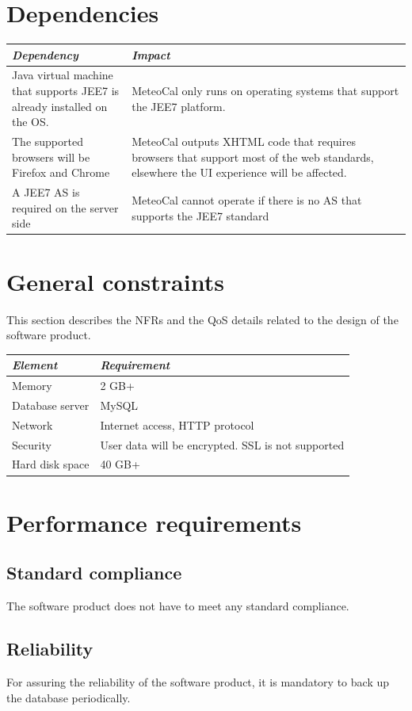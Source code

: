 \documentclass[10pt,a4paper,titlepage]{article}
\begin{document}
\section{Dependencies}
\begin{tabular}{| p{0.3\linewidth} | p{0.7\linewidth} |}
\hline	\emph{Dependency}	&	\emph{Impact}	\\
\hline	Java virtual machine that supports JEE7 is already installed on the OS. & MeteoCal only runs on operating systems that support the JEE7 platform.	\\
\hline	The supported browsers will be Firefox and Chrome & MeteoCal outputs XHTML code that requires browsers that support most of the web standards, elsewhere the UI experience will be affected.	\\
\hline	A JEE7 AS is required on the server side	&	MeteoCal cannot operate if there is no AS that supports the JEE7 standard	\\
\hline
\end{tabular}

\section{General constraints}
This section describes the NFRs and the QoS details related to the design of the software product.

\noindent\begin{tabular}{| l | l |}
\hline	\emph{Element}	&	\emph{Requirement}	\\
\hline	Memory			&	2 GB+				\\
\hline	Database server	&	MySQL				\\
\hline	Network			&	Internet access, HTTP protocol	\\
\hline	Security		&	User data will be encrypted. SSL is not supported	\\
\hline	Hard disk space	&	40 GB+				\\
\hline
\end{tabular}

\section{Performance requirements}
\subsection{Standard compliance}
The software product does not have to meet any standard compliance.

\subsection{Reliability}
For assuring the reliability of the software product, it is mandatory to back up the database periodically.
\end{document}
